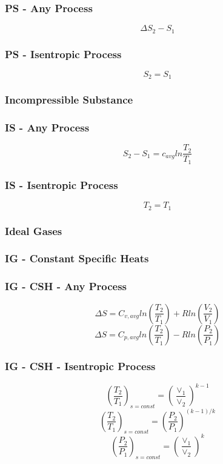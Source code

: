 \documentclass[10pt,landscape]{article}
\begin{document}
\begin{multicols}{3}
\subsubsection{PS - Any Process}
\begin{equation}
    \Delta S_2-S_1
\end{equation}
\subsubsection{PS - Isentropic Process}
\begin{equation}
    S_2=S_1
\end{equation}
\subsubsection{Incompressible Substance}
\subsubsection{IS - Any Process}
\begin{equation}
    S_2-S_1=c_{avg}ln\frac{T_2}{T_1}
\end{equation}
\subsubsection{IS - Isentropic Process}
\begin{equation}
    T_2=T_1
\end{equation}
\subsubsection{Ideal Gases}
\subsubsection{IG - Constant Specific Heats}
\subsubsection{IG - CSH - Any Process}
\begin{equation}
    \Delta S = C_{v,avg}ln(\frac{T_2}{T_1})+Rln(\frac{V_2}{V_1})
\end{equation}
\begin{equation}
    \Delta S = C_{p,avg}ln(\frac{T_2}{T_1})-Rln(\frac{P_2}{P_1})
\end{equation}
\subsubsection{IG - CSH - Isentropic Process}
\begin{equation}
   (\frac{T_2}{T_1})_{s=const}=(\frac{\vee_1}{\vee_2})^{k-1} 
\end{equation}
\begin{equation}
    (\frac{T_2}{T_1})_{s=const}=(\frac{P_2}{P_1})^{(k-1)/k}
\end{equation}
\begin{equation}
    (\frac{P_2}{P_1})_{s=const}=(\frac{\vee_1}{\vee_2})^k
\end{equation}

\end{multicols}
\end{document}
